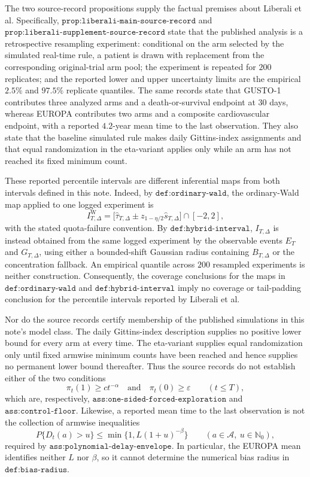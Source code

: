 The two source-record propositions supply the factual premises about Liberali et al.  Specifically, \(\texttt{prop:liberali-main-source-record}\) and \(\texttt{prop:liberali-supplement-source-record}\) state that the published analysis is a retrospective resampling experiment: conditional on the arm selected by the simulated real-time rule, a patient is drawn with replacement from the corresponding original-trial arm pool; the experiment is repeated for \(200\) replicates; and the reported lower and upper uncertainty limits are the empirical \(2.5\%\) and \(97.5\%\) replicate quantiles.  The same records state that GUSTO-1 contributes three analyzed arms and a death-or-survival endpoint at \(30\) days, whereas EUROPA contributes two arms and a composite cardiovascular endpoint, with a reported \(4.2\)-year mean time to the last observation.  They also state that the baseline simulated rule makes daily Gittins-index assignments and that equal randomization in the eta-variant applies only while an arm has not reached its fixed minimum count.

These reported percentile intervals are different inferential maps from both intervals defined in this note.  Indeed, by \(\texttt{def:ordinary-wald}\), the ordinary-Wald map applied to one logged experiment is
\[
 I_{T,\Delta}^{\mathrm W}
 =\bigl[\widehat\tau_{T,\Delta}
 \mathbin{\pm}z_{1-\eta/2}\widehat s_{T,\Delta}\bigr]\cap[-2,2],
\tag{1}
\]
with the stated quota-failure convention.  By \(\texttt{def:hybrid-interval}\), \(I_{T,\Delta}\) is instead obtained from the same logged experiment by the observable events \(E_T\) and \(G_{T,\Delta}\), using either a bounded-shift Gaussian radius containing \(B_{T,\Delta}\) or the concentration fallback.  An empirical quantile across \(200\) resampled experiments is neither construction.  Consequently, the coverage conclusions for the maps in \(\texttt{def:ordinary-wald}\) and \(\texttt{def:hybrid-interval}\) imply no coverage or tail-padding conclusion for the percentile intervals reported by Liberali et al.

Nor do the source records certify membership of the published simulations in this note's model class.  The daily Gittins-index description supplies no positive lower bound for every arm at every time.  The eta-variant supplies equal randomization only until fixed armwise minimum counts have been reached and hence supplies no permanent lower bound thereafter.  Thus the source records do not establish either of the two conditions
\[
 \pi_t(1)\geq c t^{-\alpha}
 \quad\text{and}\quad
 \pi_t(0)\geq\varepsilon
 \qquad (t\leq T),
\tag{2}
\]
which are, respectively, \(\texttt{ass:one-sided-forced-exploration}\) and \(\texttt{ass:control-floor}\).  Likewise, a reported mean time to the last observation is not the collection of armwise inequalities
\[
 P\{D_t(a)>u\}
 \leq \min\{1,L(1+u)^{-\beta}\}
 \qquad
 (a\in\mathcal A,\ u\in\mathbb N_0),
\tag{3}
\]
required by \(\texttt{ass:polynomial-delay-envelope}\).  In particular, the EUROPA mean identifies neither \(L\) nor \(\beta\), so it cannot determine the numerical bias radius in \(\texttt{def:bias-radius}\).

